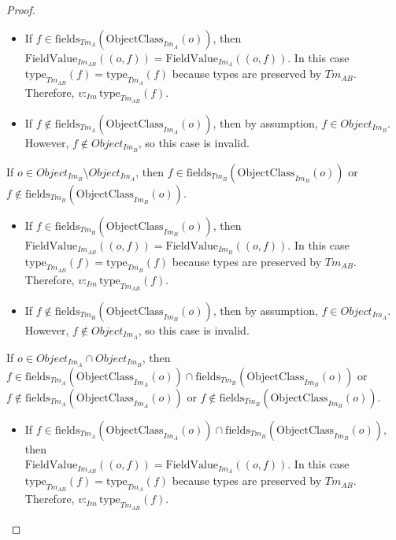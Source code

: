 \begin{proof}
\begin{itemize}
    \begin{itemize}
        \item If $f \in \mathrm{fields}_{Tm_{A}}(\mathrm{ObjectClass}_{Im_{A}}(o))$, then $\mathrm{FieldValue}_{Im_{AB}}(( o, f )) = \mathrm{FieldValue}_{Im_{A}}(( o, f ))$. In this case $\mathrm{type}_{Tm_{AB}}(f) = \mathrm{type}_{Tm_{A}}(f)$ because types are preserved by $Tm_{AB}$. Therefore, $v:_{Im} \mathrm{type}_{Tm_{AB}}(f)$.
        
        \item If $f \not\in \mathrm{fields}_{Tm_{A}}(\mathrm{ObjectClass}_{Im_{A}}(o))$, then by assumption, $f \in Object_{Im_B}$. However, $f \not\in Object_{Im_B}$, so this case is invalid.
    \end{itemize}
    
    If $o \in Object_{Im_B} \setminus Object_{Im_A}$, then $f \in \mathrm{fields}_{Tm_{B}}(\mathrm{ObjectClass}_{Im_{B}}(o))$ or \\$f \not\in \mathrm{fields}_{Tm_{B}}(\mathrm{ObjectClass}_{Im_{B}}(o))$.
    
    \begin{itemize}
        \item If $f \in \mathrm{fields}_{Tm_{B}}(\mathrm{ObjectClass}_{Im_{B}}(o))$, then $\mathrm{FieldValue}_{Im_{AB}}(( o, f )) = \mathrm{FieldValue}_{Im_{B}}(( o, f ))$. In this case $\mathrm{type}_{Tm_{AB}}(f) = \mathrm{type}_{Tm_{B}}(f)$ because types are preserved by $Tm_{AB}$. Therefore, $v:_{Im} \mathrm{type}_{Tm_{AB}}(f)$.
        
        \item If $f \not\in \mathrm{fields}_{Tm_{B}}(\mathrm{ObjectClass}_{Im_{B}}(o))$, then by assumption, $f \in Object_{Im_A}$. However, $f \not\in Object_{Im_A}$, so this case is invalid.
    \end{itemize}
    
    If $o \in Object_{Im_A} \cap Object_{Im_B}$, then \\$f \in \mathrm{fields}_{Tm_{A}}(\mathrm{ObjectClass}_{Im_{A}}(o)) \cap \mathrm{fields}_{Tm_{B}}(\mathrm{ObjectClass}_{Im_{B}}(o))$ or \\$f \not\in \mathrm{fields}_{Tm_{A}}(\mathrm{ObjectClass}_{Im_{A}}(o))$ or $f \not\in \mathrm{fields}_{Tm_{B}}(\mathrm{ObjectClass}_{Im_{B}}(o))$.
    
    \begin{itemize}
        \item If $f \in \mathrm{fields}_{Tm_{A}}(\mathrm{ObjectClass}_{Im_{A}}(o)) \cap \mathrm{fields}_{Tm_{B}}(\mathrm{ObjectClass}_{Im_{B}}(o))$, then \\$\mathrm{FieldValue}_{Im_{AB}}(( o, f )) = \mathrm{FieldValue}_{Im_{A}}(( o, f ))$. In this case $\mathrm{type}_{Tm_{AB}}(f) = \mathrm{type}_{Tm_{A}}(f)$ because types are preserved by $Tm_{AB}$. Therefore, $v:_{Im} \mathrm{type}_{Tm_{AB}}(f)$.
        

\end{itemize}
\end{itemize}
\end{proof}
